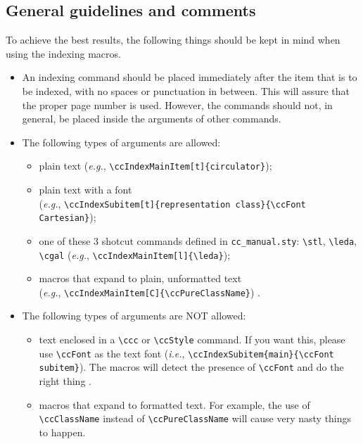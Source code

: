 \documentclass{article}
\makeatletter
\newcommand{\Mindex}[1]{\index{#1@\protect\Backslash{\tt #1}}}
\makeatother
\begin{document}
\subsection{General guidelines and comments}
\label{general_guidelines}


To achieve the best results, the following things should be
kept in mind when using the indexing macros.
\begin{itemize}
   \item An indexing command should be placed
         immediately after the
         item that is to be indexed, with no spaces or punctuation
         in between.  This will assure that the proper page number is used.
         However, the commands should not, in general, be placed inside the 
         arguments of other commands.
   \item The following types of arguments are allowed:
         \begin{itemize}
           \item plain text ({\it e.g.}, \verb|\ccIndexMainItem[t]{circulator}|);
           \item plain text with a font%
                  \\
                 ({\it e.g.}, \verb|\ccIndexSubitem[t]{representation class}{\ccFont Cartesian}|);
           \item one of these 3 shotcut commands defined in
                 \verb|cc_manual.sty|: \verb|\stl|\Mindex{stl}, 
                 \verb|\leda|\Mindex{leda}, \verb|\cgal|\Mindex{cgal}
                 ({\it e.g.}, \verb|\ccIndexMainItem[l]{\leda}|);
           \item macros that expand to plain, unformatted text \\
                 ({\it e.g.}, \verb|\ccIndexMainItem[C]{\ccPureClassName}|)
                 .
         \end{itemize}
   \item The following types of arguments are NOT allowed:
         \begin{itemize}
           \item text enclosed in a \verb|\ccc| or \verb|\ccStyle| command.  
                 If you want this, please use \verb|\ccFont| as the text font 
                 ({\it i.e.}, \verb|\ccIndexSubitem{main}{\ccFont subitem}|).
                 The macros will detect the presence of \verb|\ccFont| 
                 and do the right thing%
                 .
           \item macros that expand to formatted text.
                 For example, the use of \verb|\ccClassName| instead of 
                 \verb|\ccPureClassName| will 
                 cause very nasty things to happen.  


\end{itemize}
\end{itemize}
\end{document}
